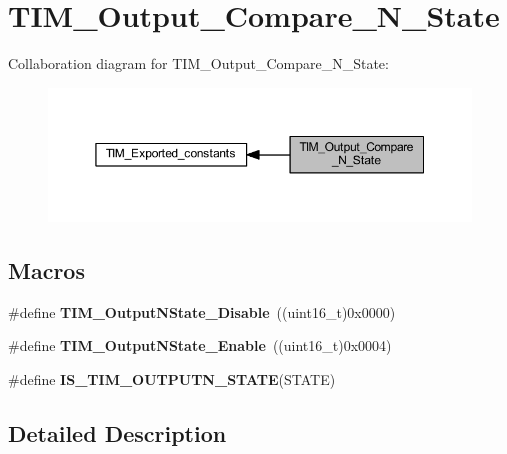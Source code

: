 \hypertarget{group___t_i_m___output___compare___n___state}{}\section{T\+I\+M\+\_\+\+Output\+\_\+\+Compare\+\_\+\+N\+\_\+\+State}
\label{group___t_i_m___output___compare___n___state}
Collaboration diagram for T\+I\+M\+\_\+\+Output\+\_\+\+Compare\+\_\+\+N\+\_\+\+State\+:
\nopagebreak
\begin{figure}[H]
\begin{center}
\leavevmode
\includegraphics[width=350pt]{group___t_i_m___output___compare___n___state}
\end{center}
\end{figure}
\subsection*{Macros}
\begin{DoxyCompactItemize}
\item 
\mbox{\label{group___t_i_m___output___compare___n___state_gade8506a50fd6ba58273e9da81f6b0b54}} 
\#define {\bfseries T\+I\+M\+\_\+\+Output\+N\+State\+\_\+\+Disable}~((uint16\+\_\+t)0x0000)
\item 
\mbox{\label{group___t_i_m___output___compare___n___state_gac4c08f9d66ce138c6978668020526c6f}} 
\#define {\bfseries T\+I\+M\+\_\+\+Output\+N\+State\+\_\+\+Enable}~((uint16\+\_\+t)0x0004)
\item 
\#define {\bfseries I\+S\+\_\+\+T\+I\+M\+\_\+\+O\+U\+T\+P\+U\+T\+N\+\_\+\+S\+T\+A\+TE}(S\+T\+A\+TE)
\end{DoxyCompactItemize}


\subsection{Detailed Description}


